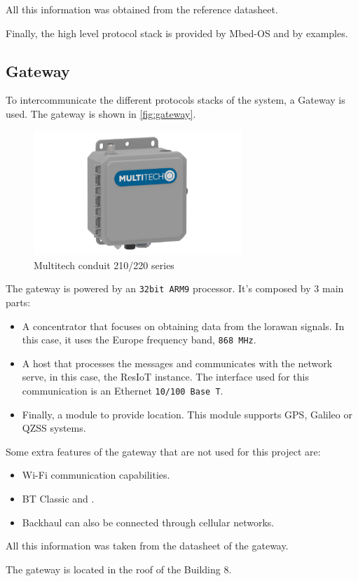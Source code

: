 All this information was obtained from the reference datasheet.

Finally, the high level protocol stack is provided by Mbed-OS and by examples.
\clearpage
\subsection{Gateway}

To intercommunicate the different protocols stacks of the system, a Gateway is used. The gateway is shown in \autoref{fig:gateway}.

\begin{figure}[H]
    \centering
    \includegraphics[width=0.7\textwidth]{images/3/multitechip67200.png}
    \caption{Multitech conduit 210/220 series}
    \label{fig:gateway}
\end{figure}

The gateway is powered by an \texttt{32bit ARM9} processor. It's composed by 3 main parts:
\begin{itemize}
    \item A concentrator that focuses on obtaining data from the \acrshort{lorawan} signals. In this case, it uses the Europe frequency band, \texttt{868 MHz}.
    \item A host that processes the  messages and communicates with the network serve, in this case, the ResIoT instance. The interface used for this communication is an Ethernet \texttt{10/100 Base T}.
    \item Finally, a  module to provide location. This module supports GPS, Galileo or QZSS systems.
\end{itemize}

Some extra features of the gateway that are not used for this project are:
\begin{itemize}
    \item Wi-Fi communication capabilities.
    \item BT Classic and .
    \item Backhaul can also be connected through cellular networks.
\end{itemize} 

All this information was taken from the datasheet of the gateway\cite{MultiTechConduitIP67}.

The gateway is located in the roof of the Building 8.

